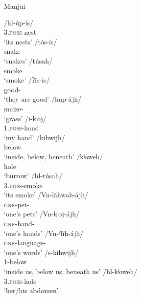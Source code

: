 \ea\label{mj-stress-survive}
Manjui \citep{JC18,GH94}\\
    \begin{xlist}
        \ex\gll /hl-úp-ís/~\\
                3.\textsc{poss}-nest-\PL\\
                \glt `its nests'
        \ex\gll /tós-ís/~\\
                snake-\PL\\
                \glt `snakes'
        \ex\gll /túsah/~\\
                smoke\\
                \glt `smoke'
        \ex\gll /ʔis-ís/~\\
                good-\PL\\
                \glt `they are good'\label{mj-aseis}
        \ex\gll /hup-ájh/~\\
                maize-\PL\\
                \glt `grass'
        \ex\gll /i-kʲoj/~\\
                1\SG.\textsc{poss}-hand\\
                \glt `my hand'
        \ex\gll /kihwijh/~\\
                below\\
                \glt `inside, below, beneath'
        \ex\gll /kʲoweh/~\\
                hole\\
                \glt `burrow'
        \ex\gll /hl-túsah/~\\
                3.\textsc{poss}-smoke\\
                \glt `its smoke'
        \ex\gll /Vn-láhwah-ájh/~\\
                {\textsc{gnr}}-pet-\PL\\
                \glt `one's pets'
        \ex\gll /Vn-kʲoj-ájh/~\\
                {\textsc{gnr}}-hand-\PL\\
                \glt `one's hands'
        \ex\gll /Vn-ˀlih-ájh/~\\
                {\textsc{gnr}}-language-\PL\\
                \glt `one's words'
        \ex\gll /s-kihwijh/~\\
                1\PL-below\\
                \glt `inside us, below us, beneath us'
        \ex\gll /hl-kʲoweh/~\\
                3.\textsc{poss}-hole\\
                \glt `her/his abdomen'
    \end{xlist}
\z

